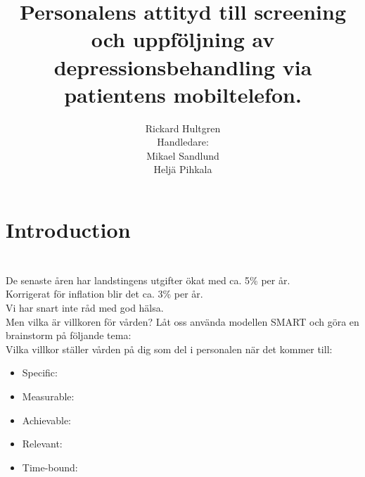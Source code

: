 \documentclass[english]{beamer}
\begin{document}
\title[]{Personalens attityd till screening och uppföljning av depressionsbehandling via patientens mobiltelefon.}

\author[Rickard Hultgren]{Rickard Hultgren\\[10mm]{\small Handledare:\\ Mikael Sandlund\\ Heljä Pihkala}}


\begin{frame}
	\titlepage
\end{frame}

\section{Introduction}
\begin{frame}
	\frametitle{}
	\frametitle{}
	\\
	De senaste åren har landstingens utgifter ökat med ca. 5\% per år.\\
	Korrigerat för inflation blir det ca. 3\% per år.\\
	Vi har snart inte råd med god hälsa.\\
	\pause
	\textcolor{lila}{Men vilka är villkoren för vården? Låt oss använda modellen SMART och göra en brainstorm på följande tema:\\Vilka villkor ställer vården på dig som del i personalen när det kommer till:}\\
	\begin{itemize}
		\item \textcolor{lila}{Specific:}
		\item\textcolor{lila}{Measurable:}
		\item\textcolor{lila}{Achievable:}
		\item\textcolor{lila}{Relevant:}
		\item\textcolor{lila}{Time-bound:}
	\end{itemize}
\end{frame}
\end{document}
